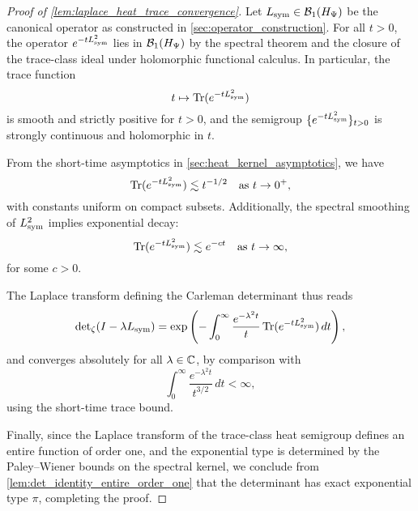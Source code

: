 \begin{proof}[Proof of \cref{lem:laplace_heat_trace_convergence}]
Let \( L_{\mathrm{sym}} \in \mathcal{B}_1(H_{\Psi}) \) be the canonical operator as constructed in \cref{sec:operator_construction}. For all \( t > 0 \), the operator \( e^{-t L_{\mathrm{sym}}^2} \) lies in \( \mathcal{B}_1(H_{\Psi}) \) by the spectral theorem and the closure of the trace-class ideal under holomorphic functional calculus. In particular, the trace function
\[
t \mapsto \operatorname{Tr}(e^{-t L_{\mathrm{sym}}^2})
\]
is smooth and strictly positive for \( t > 0 \), and the semigroup \( \{ e^{-t L_{\mathrm{sym}}^2} \}_{t > 0} \) is strongly continuous and holomorphic in \( t \).

\smallskip
\noindent
From the short-time asymptotics in \cref{sec:heat_kernel_asymptotics}, we have
\[
\operatorname{Tr}(e^{-t L_{\mathrm{sym}}^2}) \lesssim t^{-1/2} \quad \text{as } t \to 0^+,
\]
with constants uniform on compact subsets. Additionally, the spectral smoothing of \( L_{\mathrm{sym}}^2 \) implies exponential decay:
\[
\operatorname{Tr}(e^{-t L_{\mathrm{sym}}^2}) \lesssim e^{-ct} \quad \text{as } t \to \infty,
\]
for some \( c > 0 \).

\smallskip
\noindent
The Laplace transform defining the Carleman determinant thus reads
\[
\det\nolimits_\zeta(I - \lambda L_{\mathrm{sym}}) = \exp\left( - \int_0^\infty \frac{e^{-\lambda^2 t}}{t} \operatorname{Tr}(e^{-t L_{\mathrm{sym}}^2}) \, dt \right),
\]
and converges absolutely for all \( \lambda \in \mathbb{C} \), by comparison with
\[
\int_0^\infty \frac{e^{-\lambda^2 t}}{t^{3/2}} \, dt < \infty,
\]
using the short-time trace bound.

\smallskip
\noindent
Finally, since the Laplace transform of the trace-class heat semigroup defines an entire function of order one, and the exponential type is determined by the Paley--Wiener bounds on the spectral kernel, we conclude from \cref{lem:det_identity_entire_order_one} that the determinant has exact exponential type \( \pi \), completing the proof.
\end{proof}
